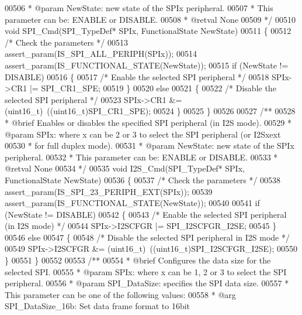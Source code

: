 \begin{DoxyCode}
00506 \textcolor{comment}{  * @param  NewState: new state of the SPIx peripheral. }
00507 \textcolor{comment}{  *          This parameter can be: ENABLE or DISABLE.}
00508 \textcolor{comment}{  * @retval None}
00509 \textcolor{comment}{  */}
00510 \textcolor{keywordtype}{void} SPI_Cmd(SPI\_TypeDef* SPIx, FunctionalState NewState)
00511 \{
00512   \textcolor{comment}{/* Check the parameters */}
00513   assert_param(IS\_SPI\_ALL\_PERIPH(SPIx));
00514   assert_param(IS\_FUNCTIONAL\_STATE(NewState));
00515   \textcolor{keywordflow}{if} (NewState != DISABLE)
00516   \{
00517     \textcolor{comment}{/* Enable the selected SPI peripheral */}
00518     SPIx->CR1 |= SPI_CR1_SPE;
00519   \}
00520   \textcolor{keywordflow}{else}
00521   \{
00522     \textcolor{comment}{/* Disable the selected SPI peripheral */}
00523     SPIx->CR1 &= (uint16\_t)~((uint16\_t)SPI_CR1_SPE);
00524   \}
00525 \}
00526 
00527 \textcolor{comment}{/**}
00528 \textcolor{comment}{  * @brief  Enables or disables the specified SPI peripheral (in I2S mode).}
00529 \textcolor{comment}{  * @param  SPIx: where x can be 2 or 3 to select the SPI peripheral (or I2Sxext }
00530 \textcolor{comment}{  *         for full duplex mode).}
00531 \textcolor{comment}{  * @param  NewState: new state of the SPIx peripheral. }
00532 \textcolor{comment}{  *         This parameter can be: ENABLE or DISABLE.}
00533 \textcolor{comment}{  * @retval None}
00534 \textcolor{comment}{  */}
00535 \textcolor{keywordtype}{void} I2S_Cmd(SPI\_TypeDef* SPIx, FunctionalState NewState)
00536 \{
00537   \textcolor{comment}{/* Check the parameters */}
00538   assert_param(IS\_SPI\_23\_PERIPH\_EXT(SPIx));
00539   assert_param(IS\_FUNCTIONAL\_STATE(NewState));
00540 
00541   \textcolor{keywordflow}{if} (NewState != DISABLE)
00542   \{
00543     \textcolor{comment}{/* Enable the selected SPI peripheral (in I2S mode) */}
00544     SPIx->I2SCFGR |= SPI_I2SCFGR_I2SE;
00545   \}
00546   \textcolor{keywordflow}{else}
00547   \{
00548     \textcolor{comment}{/* Disable the selected SPI peripheral in I2S mode */}
00549     SPIx->I2SCFGR &= (uint16\_t)~((uint16\_t)SPI_I2SCFGR_I2SE);
00550   \}
00551 \}
00552 
00553 \textcolor{comment}{/**}
00554 \textcolor{comment}{  * @brief  Configures the data size for the selected SPI.}
00555 \textcolor{comment}{  * @param  SPIx: where x can be 1, 2 or 3 to select the SPI peripheral.}
00556 \textcolor{comment}{  * @param  SPI\_DataSize: specifies the SPI data size.}
00557 \textcolor{comment}{  *          This parameter can be one of the following values:}
00558 \textcolor{comment}{  *            @arg SPI\_DataSize\_16b: Set data frame format to 16bit}

\end{DoxyCode}
